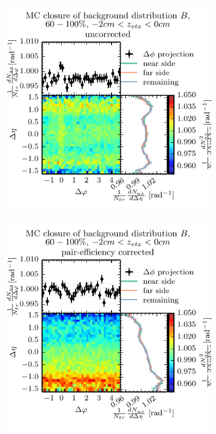 \begin{figure}
\begin{subfigure}[b]{0.5\textwidth}
  \end{subfigure}
  \begin{subfigure}[b]{0.5\textwidth}
    \includegraphics[width=\textwidth]{figures/closure_B_peri_no_st.pdf}
  \end{subfigure}%
  \begin{subfigure}[b]{0.5\textwidth}
    \includegraphics[width=\textwidth]{figures/closure_B_peri_st.pdf}

\end{subfigure}
\end{figure}
